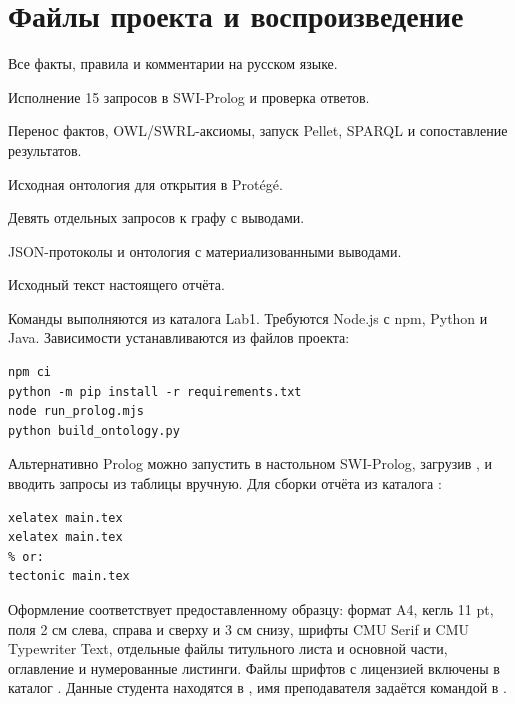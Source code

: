 \section{Файлы проекта и воспроизведение}
\begin{description}[style=nextline,leftmargin=0pt,labelwidth=0pt]
\item[\code{knowledge.pl}] Все факты, правила и комментарии на русском языке.
\item[\code{run_prolog.mjs}] Исполнение 15 запросов в SWI-Prolog и проверка ответов.
\item[\code{build_ontology.py}] Перенос фактов, OWL/SWRL-аксиомы, запуск Pellet, SPARQL и сопоставление результатов.
\item[\code{game_ontology.owl}] Исходная онтология для открытия в Protégé.
\item[\code{queries.sparql}] Девять отдельных запросов к графу с выводами.
\item[\code{results/}] JSON-протоколы и онтология с материализованными выводами.
\item[\code{report/main.tex, title.tex, 1.tex}] Исходный текст настоящего отчёта.
\end{description}
Команды выполняются из каталога Lab1. Требуются Node.js с npm, Python и Java. Зависимости устанавливаются из файлов проекта:
\begin{lstlisting}
npm ci
python -m pip install -r requirements.txt
node run_prolog.mjs
python build_ontology.py
\end{lstlisting}
Альтернативно Prolog можно запустить в настольном SWI-Prolog, загрузив , и вводить запросы из таблицы вручную. Для сборки отчёта из каталога :
\begin{lstlisting}
xelatex main.tex
xelatex main.tex
% or:
tectonic main.tex
\end{lstlisting}
Оформление соответствует предоставленному образцу: формат A4, кегль 11 pt, поля 2 см слева, справа и сверху и 3 см снизу, шрифты CMU Serif и CMU Typewriter Text, отдельные файлы титульного листа и основной части, оглавление и нумерованные листинги. Файлы шрифтов с лицензией включены в каталог . Данные студента находятся в , имя преподавателя задаётся командой  в .
